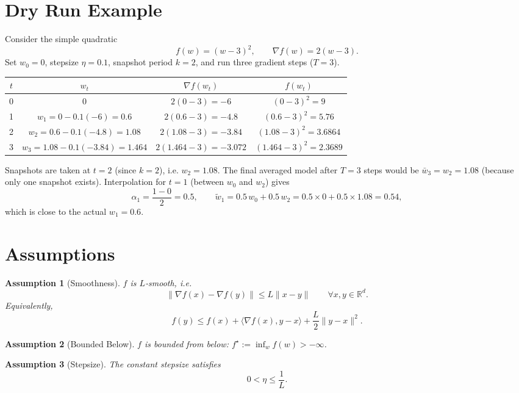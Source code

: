 \documentclass{article}
\newtheorem{assumption}{Assumption}
\begin{document}
\section*{Dry Run Example}
Consider the simple quadratic
\[
f(w)=(w-3)^{2},\qquad \nabla f(w)=2(w-3).
\]
Set $w_{0}=0$, stepsize $\eta=0.1$, snapshot period $k=2$, and run three
gradient steps ($T=3$).

\begin{center}
\begin{tabular}{c|c|c|c}
$t$ & $w_{t}$ & $\nabla f(w_{t})$ & $f(w_{t})$ \\ \hline
0 & $0$ & $2(0-3)=-6$ & $(0-3)^{2}=9$ \\ 
1 & $w_{1}=0-0.1(-6)=0.6$ & $2(0.6-3)=-4.8$ & $(0.6-3)^{2}=5.76$ \\ 
2 & $w_{2}=0.6-0.1(-4.8)=1.08$ & $2(1.08-3)=-3.84$ & $(1.08-3)^{2}=3.6864$ \\ 
3 & $w_{3}=1.08-0.1(-3.84)=1.464$ & $2(1.464-3)=-3.072$ & $(1.464-3)^{2}=2.3689$
\end{tabular}
\end{center}

Snapshots are taken at $t=2$ (since $k=2$), i.e. $w_{2}=1.08$.  
The final averaged model after $T=3$ steps would be $\bar w_{3}=w_{2}=1.08$
(because only one snapshot exists).  
Interpolation for $t=1$ (between $w_{0}$ and $w_{2}$) gives
\[
\alpha_{1}= \frac{1-0}{2}=0.5,\qquad
\tilde w_{1}=0.5\,w_{0}+0.5\,w_{2}=0.5\times0+0.5\times1.08=0.54,
\]
which is close to the actual $w_{1}=0.6$.

\section*{Assumptions}
\begin{assumption}[Smoothness]\label{as:smooth}
$f$ is $L$‑smooth, i.e.
\[
\|\nabla f(x)-\nabla f(y)\|\le L\|x-y\|\qquad\forall x,y\in\mathbb{R}^{d}.
\tag{A1}
\]
Equivalently,
\[
f(y)\le f(x)+\langle\nabla f(x),y-x\rangle+\frac{L}{2}\|y-x\|^{2}.
\tag{A1'}
\]
\end{assumption}

\begin{assumption}[Bounded Below]\label{as:lower}
$f$ is bounded from below: $f^{\star}:=\inf_{w}f(w)>-\infty$.
\end{assumption}

\begin{assumption}[Stepsize]\label{as:step}
The constant stepsize satisfies
\[
0<\eta\le\frac{1}{L}.
\tag{A3}
\]
\end{assumption}
\end{document}
